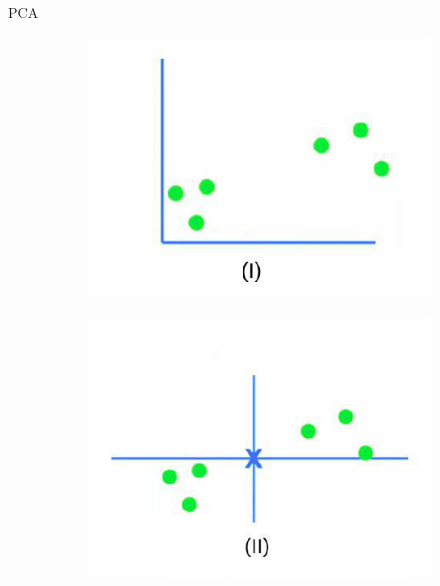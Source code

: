 \begin{frame}{PCA}
    \begin{figure}
        \centering
        \caption{PCA algorithm steps.} \pause
        \begin{subfigure}{0.3\textwidth}
            \centering
            \includegraphics[width=\linewidth]{fig/ch2-pca-steps-01.png}
        \end{subfigure}  \pause
        \begin{subfigure}{0.3\textwidth}
            \centering
            \includegraphics[width=\linewidth]{fig/ch2-pca-steps-02.png}
        \end{subfigure} \pause
        \begin{subfigure}{0.3\textwidth} 

\end{subfigure}
\end{figure}
\end{frame}
